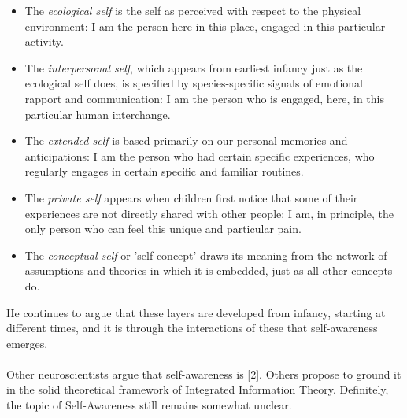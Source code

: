 \documentclass{amsbook}
\begin{document}
{\begin{itemize}
    \item The \textit{ecological self} is the self as perceived with respect to the physical environment: I am the person here in this place, engaged in this particular activity. 
    \item The \textit{interpersonal self}, which appears from earliest infancy just as the ecological self does, is specified by species-specific signals of emotional rapport and communication: I am the person who is engaged, here, in this particular human interchange. 
    \item The \textit{extended self} is based primarily on our personal memories and anticipations: I am the person who had certain specific experiences, who regularly engages in certain specific and familiar routines.
    \item The \textit{private self} appears when children first notice that some of their experiences are not directly shared with other people: I am, in principle, the only person who can feel this unique and particular pain. 
    \item The \textit{conceptual self} or 'self-concept' draws its meaning from the network of assumptions and theories in which it is embedded, just as all other concepts do. 
\end{itemize}
He continues to argue that these layers are developed from infancy, starting at different times, and it is through the interactions of these  that self-awareness emerges.\\\\
Other neuroscientists argue that self-awareness is [2]. Others propose to ground it in the solid theoretical framework of Integrated Information Theory. Definitely, the topic of Self-Awareness still remains somewhat unclear.\\

}
\end{document}

